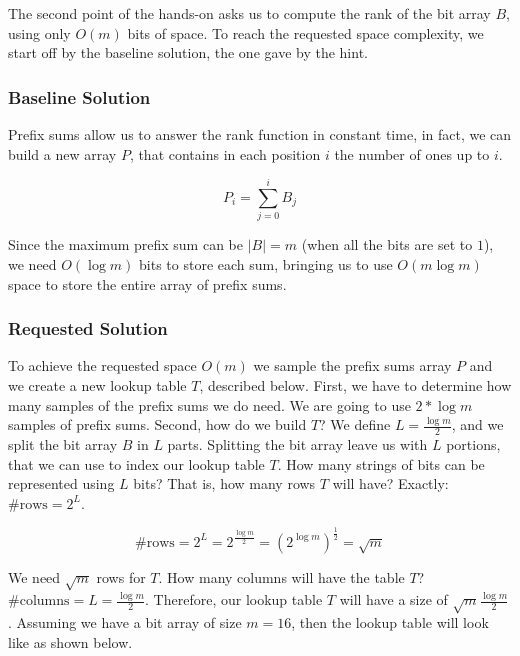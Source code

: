 \documentclass{article}
\begin{document}
The second point of the hands-on asks us to compute the rank of the bit array $B$, using only $O(m)$ bits of space. To reach the requested space complexity,
we start off by the baseline solution, the one gave by the hint.\\

\subsubsection{Baseline Solution}

\noindent Prefix sums allow us to answer the rank function in constant time, in fact, we can build a new array $P$, that contains in each position $i$ the number of ones
up to $i$.

\begin{equation}
    P_i = \sum_{j = 0}^{i} B_j
\end{equation}

\noindent Since the maximum prefix sum can be $|B| = m$ (when all the bits are set to $1$), we need $O(\log m)$ bits to store each sum, bringing us to use
$O(m \log m)$ space to store the entire array of prefix sums.\\

\subsubsection{Requested Solution}

\noindent To achieve the requested space $O(m)$ we sample the prefix sums array $P$ and we create a new lookup table $T$, described below. First, we have to determine how many samples
of the prefix sums we do need. We are going to use $2 * \log m$ samples of prefix sums. Second, how do we build $T$? We define $L = \frac{\log m}{2}$, and we split the bit array $B$
in $L$ parts. Splitting the bit array leave us with $L$ portions, that we can use to index our lookup table $T$. 
How many strings of bits can be represented using $L$ bits? That is, how many rows $T$ will have? Exactly: $\#\textrm{rows} = 2^L$.

\begin{equation}
    \textrm{\#rows} = 2^L = 2^{\frac{\log m}{2}} = (2^{\log m})^{\frac{1}{2}} = \sqrt m
\end{equation}

\noindent We need $\sqrt m$ rows for $T$. How many columns will have the table $T$? $\# \textrm{columns} = L = \frac{\log m}{2}$. Therefore, our lookup table $T$ will have a size of $\sqrt m \frac{\log m}{2}$. Assuming we have a bit array of size 
$m = 16$, then the lookup table will look like as shown below.
\end{document}
